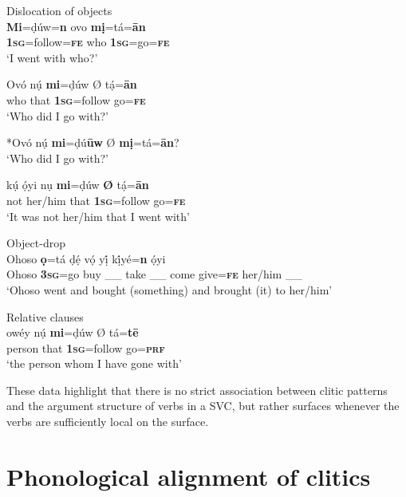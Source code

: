 \documentclass[output=paper]{langsci/langscibook}
\begin{document}
\ea
{Dislocation of objects}\\
\gll   \textbf{Mi}=ḍúw=\textbf{n }    ovo     \textbf{mị}=tá=\textbf{\={a}n}\\
      \textbf{1}\textbf{\textsc{sg}}=follow=\textbf{\textsc{fe}}   who   \textbf{1}\textbf{\textsc{sg}}=go=\textbf{\textsc{fe}}\\
\glt ‘I went with who?’
\z

\ea
\gll   Ovó   nụ́   \textbf{mi}=ḍúw    Ø  tạ́=\textbf{\={a}n}\\
      who   that   \textbf{1}\textbf{\textsc{sg}}=follow     go=\textbf{\textsc{fe}}\\
\glt ‘Who did I go with?’
\z

\ea
    *Ovó nụ́ \textbf{mi}=ḍú\textbf{\={u}w} Ø \textbf{mị}=tá=\textbf{\={a}n}?\\
\glt ‘Who did I go with?’
\z

\ea
\gll   kụ́   ọ́yi     nụ     \textbf{mi}=ḍúw   \textbf{Ø}  tạ́=\textbf{\={a}n}\\
       not   her/him   that     \textbf{\textsc{1sg}}=follow     go=\textbf{\textsc{fe}}\\
\glt ‘It was not her/him that I went with’ 
\z

\ea
{Object-drop}\\
\gll  Ohoso   \textbf{ọ}=tá   ḍẹ́     vọ́     yị́    kị́yé=\textbf{n }  ọ́yi\\
     Ohoso   \textbf{3}\textbf{\textsc{sg}}=go   buy   \_\_  take \_\_  come   give=\textbf{\textsc{fe}}  her/him  \_\_\\
\glt ‘Ohoso went and bought (something) and brought (it) to her/him’ \citep[121]{Kari2004}
\z

\ea
{Relative clauses }\\
\gll  owéy     nụ́     \textbf{mi}=ḍúw Ø tá=\textbf{t\={e}}\\
     person    that    \textbf{\textsc{1sg}}=follow    go=\textbf{\textsc{prf}}\\
\glt ‘the person whom I have gone with’
\z

These data highlight that there is no strict association between clitic patterns and the argument structure of verbs in a SVC, but rather surfaces whenever the verbs are sufficiently local on the surface. 

\section{Phonological alignment of clitics }
\end{document}
